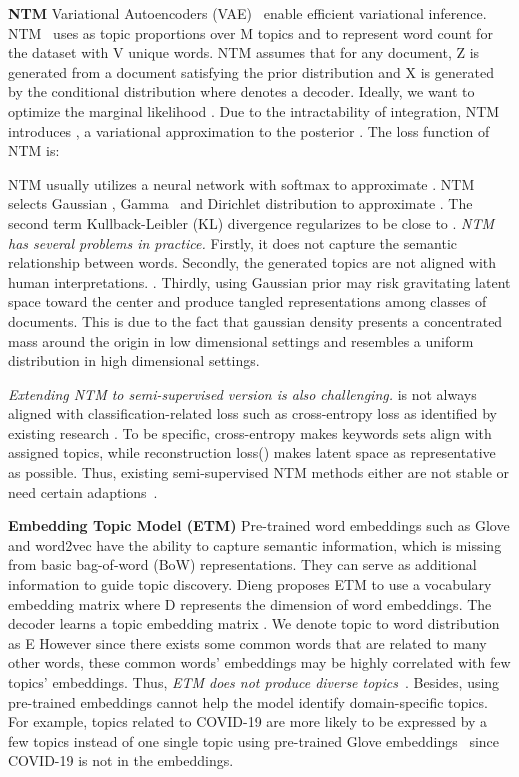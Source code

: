 \documentclass[11pt]{article}
\begin{document}
\textbf{NTM} Variational Autoencoders (VAE)~\cite{https://doi.org/10.48550/arxiv.1312.6114} enable efficient variational inference. NTM~\cite{https://doi.org/10.48550/arxiv.1511.06038} uses  as topic proportions over M topics and  to represent word count for the dataset with V unique words. NTM assumes that for any document, Z is generated from a document satisfying the prior distribution  and X is generated by the conditional distribution  where  denotes a decoder. Ideally, we want to optimize the marginal likelihood . Due to the intractability of integration, NTM introduces , a variational approximation to the posterior . The loss function of NTM is: 
 
NTM usually utilizes a neural network with softmax to approximate  \cite{srivastava2017autoencoding}. NTM selects Gaussian \cite{miao2016neural}, Gamma~\cite{zhang2020whai} and Dirichlet distribution \cite{JMLR:v20:18-569} to approximate . The second term Kullback-Leibler (KL) divergence regularizes   to be close to . \textit{NTM has several problems in practice.} Firstly, it does not capture the semantic relationship between words. Secondly, the generated topics are not aligned with human interpretations. \cite{hoyle2021automated}.  Thirdly, using Gaussian prior may risk gravitating latent space toward the center and produce tangled representations among classes of documents. This is due to the fact that gaussian density presents a concentrated mass around the origin in low dimensional settings \cite{2013} and resembles a uniform distribution in high dimensional settings. 


\textit{Extending NTM to semi-supervised version is also challenging.}  is not always aligned with classification-related loss such as cross-entropy loss as identified by existing research \cite{https://doi.org/10.48550/arxiv.2204.03208}. To be specific, cross-entropy makes keywords sets align with assigned topics, while reconstruction loss() makes latent space as representative as possible. Thus, existing semi-supervised NTM methods either are not stable \cite{wang2021neural,Harandizadeh_2022} or need certain adaptions~\cite{gemp2019weakly}. 

\textbf{Embedding Topic Model (ETM)} Pre-trained word embeddings such as Glove \cite{pennington-etal-2014-glove} and word2vec \cite{mikolov2013efficient} have the ability to capture semantic information, which is missing from basic bag-of-word (BoW) representations. 
They can serve as additional information to guide topic discovery. Dieng \cite{dieng2020topic} proposes ETM to use a vocabulary embedding matrix  where D represents the dimension of word embeddings. The decoder  learns a topic embedding matrix . We denote topic to word distribution  as E    However since there exists some common words that are related to many other words, these common words' embeddings may be highly correlated with few topics' embeddings. Thus, \textit{ETM does not produce diverse topics}~\cite{zhao2020neural}. Besides, using pre-trained embeddings cannot help the model identify domain-specific topics. For example, topics related to COVID-19 are more likely to be expressed by a few topics instead of one single topic using pre-trained Glove embeddings~\cite{pennington2014glove} since COVID-19 is not in the embeddings. 
\end{document}
